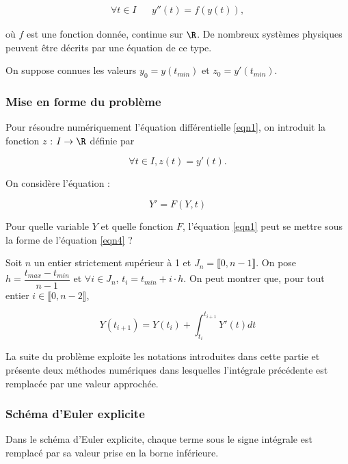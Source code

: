 \begin{align}\label{eqn1}
\forall t \in I && y''(t)=f(y(t)),
\end{align}

où $f$ est une fonction donnée, continue sur $\R$. De nombreux systèmes physiques peuvent être décrits par une
équation de ce type.

On suppose connues les valeurs $y_0 = y(t_{min})$ et $z_0 = y'(t_{min})$. 

\subsubsection*{Mise en forme du problème}

Pour résoudre numériquement l'équation différentielle \eqref{eqn1}, on introduit la fonction $z$ : $I\to \R$ définie par 

\begin{equation}
\forall t\in I, z(t)=y'(t).
\end{equation}

On considère l'équation : 

\begin{equation}\label{eqn4}
Y'=F(Y,t)
\end{equation}

\question{} Pour quelle variable $Y$ et quelle fonction $F$, l'équation \eqref{eqn1} peut se mettre sous la forme de l'équation \eqref{eqn4} ?


Soit $n$ un entier strictement supérieur à 1 et $J_n=\llbracket 0,n-1 \rrbracket$.
On pose $h=\dfrac{t_{max}-t_{min}}{n-1}$ et $\forall i \in J_n$, $t_i=t_{min}+i\cdot h$. On peut montrer que, pour tout entier $i\in \llbracket 0,n-2 \rrbracket$,

\begin{equation}\label{eqn3}
\displaystyle
Y(t_{i+1})=Y(t_i)+\int_{t_i}^{t_{i+1}}Y'(t)dt
\end{equation}


La suite du problème exploite les notations introduites dans cette partie et présente deux méthodes numériques
dans lesquelles l'intégrale précédente est remplacée par une valeur approchée.

\subsubsection*{Schéma d'Euler explicite}

Dans le schéma d'Euler explicite, chaque terme sous le signe intégrale est remplacé par sa valeur prise en la borne inférieure.


